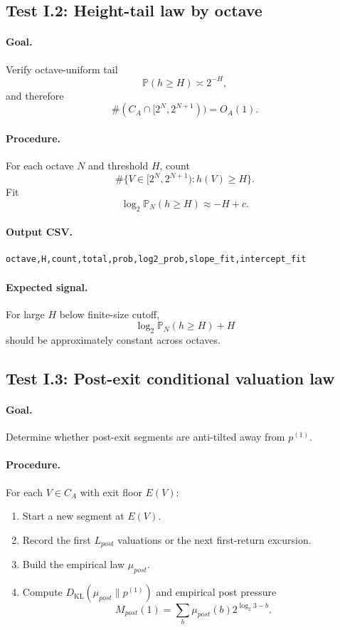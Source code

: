 \documentclass[11pt]{article}
\newcommand{\Prob}{\mathbb P}
\newcommand{\KL}{D_{\mathrm{KL}}}
\begin{document}
\subsection{Test I.2: Height-tail law by octave}

\paragraph{Goal.} Verify octave-uniform tail
\[
  \Prob(h\ge H)\asymp2^{-H},
\]
and therefore
\[
  \#(C_A\cap[2^N,2^{N+1}))=O_A(1).
\]

\paragraph{Procedure.}
For each octave $N$ and threshold $H$, count
\[
  \#\{V\in[2^N,2^{N+1}):h(V)\ge H\}.
\]
Fit
\[
  \log_2 \Prob_N(h\ge H)\approx -H+c.
\]

\paragraph{Output CSV.}
\begin{verbatim}
octave,H,count,total,prob,log2_prob,slope_fit,intercept_fit
\end{verbatim}

\paragraph{Expected signal.}
For large $H$ below finite-size cutoff,
\[
  \log_2\Prob_N(h\ge H)+H
\]
should be approximately constant across octaves.

\subsection{Test I.3: Post-exit conditional valuation law}

\paragraph{Goal.} Determine whether post-exit segments are anti-tilted away from $p^{(1)}$.

\paragraph{Procedure.}
For each $V\in C_A$ with exit floor $E(V)$:
\begin{enumerate}
  \item Start a new segment at $E(V)$.
  \item Record the first $L_{post}$ valuations or the next first-return excursion.
  \item Build the empirical law $\mu_{post}$.
  \item Compute $\KL(\mu_{post}\|p^{(1)})$ and empirical post pressure
  \[
    M_{post}(1)=\sum_b\mu_{post}(b)2^{\log_2 3-b}.
  \]
\end{enumerate}
\end{document}
